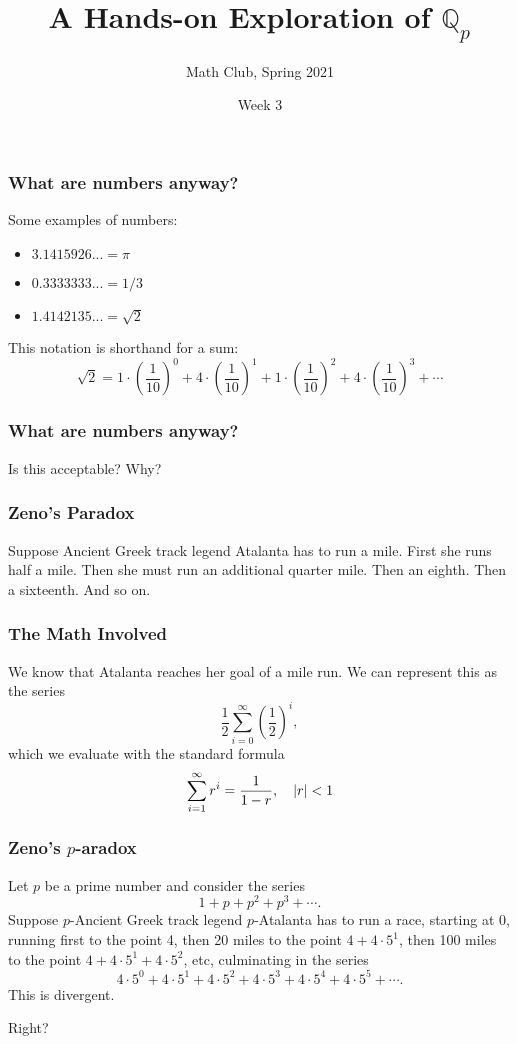 \documentclass[10pt]{beamer}
\title{A Hands-on Exploration of \(\mathbb{Q}_p\)}
\subtitle{Math Club, Spring 2021}
\date{Week 3}
\author{}
\institute{University of California, Santa Barbara}
\begin{document}
\maketitle

\begin{frame}
    \frametitle{What are numbers anyway?}

    Some examples of numbers:
    \begin{itemize}
        \item \(3.1415926...=\pi\)
        \item \(0.3333333...=1/3\)
        \item \(1.4142135...=\sqrt{2}\)
    \end{itemize}
    This notation is shorthand for a sum:
    \[\sqrt{2}=1\cdot\left(\frac{1}{10}\right)^0 + 4\cdot\left(\frac{1}{10}\right)^1 + 1\cdot\left(\frac{1}{10}\right)^2 + 4\cdot\left(\frac{1}{10}\right)^3 + \cdots\]

\end{frame}

\begin{frame}
    \frametitle{What are numbers anyway?}

    \begin{center}
        \Huge Is this acceptable? Why?
    \end{center}

\end{frame}

\begin{frame}
    \frametitle{Zeno's Paradox}

    Suppose Ancient Greek track legend Atalanta has to run a mile.
    First she runs half a mile.
    Then she must run an additional quarter mile.
    Then an eighth.
    Then a sixteenth.
    And so on.

\end{frame}

\begin{frame}
    \frametitle{The Math Involved}

    We know that Atalanta reaches her goal of a mile run.
    We can represent this as the series
    \[\frac{1}{2}\sum_{i=0}^\infty\left(\frac{1}{2}\right)^i,\]
    which we evaluate with the standard formula
    \[\sum_{i=1}^\infty r^i=\frac{1}{1-r},\quad \abs{r}<1\]

\end{frame}

\begin{frame}
    \frametitle{Zeno's \(p\)-aradox}

    Let \(p\) be a prime number and consider the series
    \[1+p+p^2+p^3+\cdots.\]
    Suppose \(p\)-Ancient Greek track legend \(p\)-Atalanta has to run a race, starting at 0, running first to the point 4, then 20 miles to the point \(4+4\cdot 5^1\), then 100 miles to the point \(4+4\cdot 5^1+4\cdot 5^2\), etc, culminating in the series
    \[4\cdot 5^0 + 4\cdot 5^1 + 4\cdot 5^2 + 4\cdot 5^3 + 4\cdot 5^4 + 4\cdot 5^5 + \cdots.\]
    This is divergent.

    Right?

\end{frame}
\end{document}
